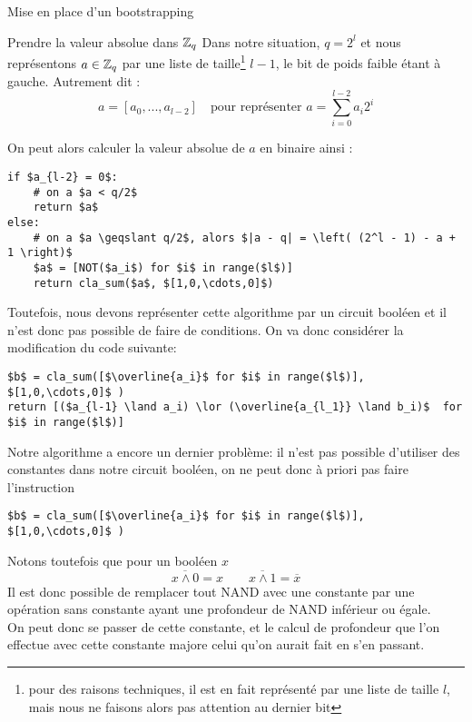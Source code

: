 \begin{section}{Mise en place d'un bootstrapping}
\begin{subsection}{Prendre la valeur absolue dans $\mathbb{Z}_q$}
	Dans notre situation, $q = 2^l$ et nous représentons $a\in \mathbb{Z}_q$ par une liste de taille\footnote{pour des raisons techniques, il est en fait représenté par une liste de taille $l$, mais nous ne faisons alors pas attention au dernier bit} $l-1$, le bit de poids faible étant à gauche. Autrement dit :
\[ a = [a_0, ..., a_{l-2}] \quad \text{pour représenter } a = \sum_{i=0}^{l-2} a_i 2^i\]

	On peut alors calculer la valeur absolue de $a$ en binaire ainsi :

\vspace{0.3cm}
\begin{lstlisting}
if $a_{l-2} = 0$: 
	# on a $a < q/2$
	return $a$
else:
	# on a $a \geqslant q/2$, alors $|a - q| = \left( (2^l - 1) - a + 1 \right)$
	$a$ = [NOT($a_i$) for $i$ in range($l$)]
	return cla_sum($a$, $[1,0,\cdots,0]$)
\end{lstlisting}
\vspace{0.3cm}

Toutefois, nous devons représenter cette algorithme par un circuit booléen et il n'est donc pas possible de faire de
conditions. On va donc considérer la modification du code suivante:

\vspace{0.3cm}
\begin{lstlisting}
$b$ = cla_sum([$\overline{a_i}$ for $i$ in range($l$)], $[1,0,\cdots,0]$ )
return [($a_{l-1} \land a_i) \lor (\overline{a_{l_1}} \land b_i)$  for $i$ in range($l$)]
\end{lstlisting}
\vspace{0.3cm}

Notre algorithme a encore un dernier problème: il n'est pas possible d'utiliser des constantes
dans notre circuit booléen, on ne peut donc à priori pas faire l'instruction

\vspace{0.3cm}
\begin{lstlisting}
$b$ = cla_sum([$\overline{a_i}$ for $i$ in range($l$)], $[1,0,\cdots,0]$ )
\end{lstlisting}
\vspace{0.3cm}
Notons toutefois que pour un booléen $x$
\[\overline{x \wedge 0 } = x \qquad \overline{x \wedge 1 } = \overline{x}\]
Il est donc possible de remplacer tout NAND avec une  constante par une opération sans constante
ayant une profondeur de NAND inférieur ou égale. \\
On peut donc se passer de cette constante, et le calcul de profondeur que l'on effectue avec cette constante
majore celui qu'on aurait fait en s'en passant.


\end{subsection}
\end{section}

